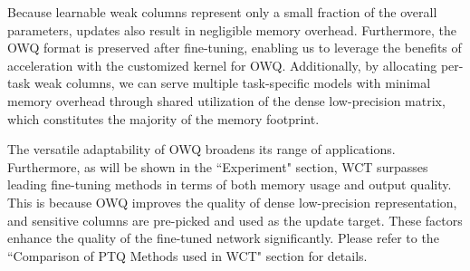 \documentclass[letterpaper]{article} %
\begin{document}
Because learnable weak columns represent only a small fraction of the overall parameters, updates also result in negligible memory overhead. Furthermore, the OWQ format is preserved after fine-tuning, enabling us to leverage the benefits of acceleration with the customized kernel for OWQ. Additionally, by allocating per-task weak columns, we can serve multiple task-specific models with minimal memory overhead through shared utilization of the dense low-precision matrix, which constitutes the majority of the memory footprint.

The versatile adaptability of OWQ broadens its range of applications. Furthermore, as will be shown in the ``Experiment" section, WCT surpasses leading fine-tuning methods in terms of both memory usage and output quality. This is because OWQ improves the quality of dense low-precision representation, and sensitive columns are pre-picked and used as the update target. These factors enhance the quality of the fine-tuned network significantly. 
Please refer to the ``Comparison of PTQ Methods used in WCT" section for details.
\end{document}
